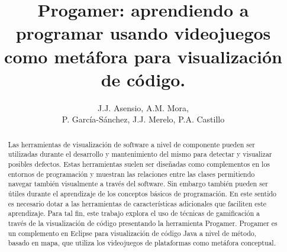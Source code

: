 \documentclass{llncs}
\begin{document}

\title{Progamer: aprendiendo a programar usando videojuegos como metáfora para visualización de código.}


\author{J.J. Asensio, A.M. Mora, \\P. García-Sánchez, J.J. Merelo, P.A. Castillo}

\maketitle
%
%
\begin{abstract} 
Las herramientas de visualización de software a nivel de componente
pueden ser utilizadas durante el desarrollo y mantenimiento del mismo
para detectar y visualizar posibles defectos. Estas herramientas
suelen ser diseñadas como complementos en los entornos de programación y
muestran las relaciones entre las clases permitiendo navegar también
visualmente a través del software. Sin embargo también pueden ser
útiles durante el aprendizaje de los conceptos básicos de
programación. En este sentido es necesario dotar a las herramientas de
características adicionales que faciliten este aprendizaje. Para tal
fin, este trabajo explora el uso de técnicas de gamificación a través de la visualización de código presentando la herramienta Progamer. Progamer es un
complemento en Eclipse para visualización de código Java a nivel de método,
basado en mapa, que utiliza los videojuegos de plataformas como metáfora conceptual.
\end{abstract}


%
%
\end{document}
